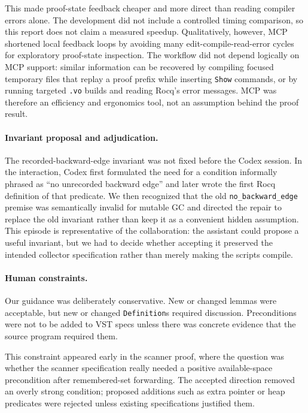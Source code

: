 \documentclass[acmsmall,nonacm]{acmart}
\newcommand{\Rocq}{Rocq}
\newcommand{\VST}{VST}
\begin{document}
This made proof-state feedback cheaper and more direct than reading compiler
errors alone.  The development did not include a controlled timing comparison,
so this report does not claim a measured speedup.  Qualitatively, however, MCP
shortened local feedback loops by avoiding many edit-compile-read-error cycles
for exploratory proof-state inspection.  The workflow did not depend logically
on MCP support: similar information can be recovered by compiling focused
temporary files that replay a proof prefix while inserting \texttt{Show}
commands, or by running targeted \texttt{.vo} builds and reading Rocq's error
messages.  MCP was therefore an efficiency and ergonomics tool, not an
assumption behind the proof result.

\paragraph{Invariant proposal and adjudication.}
The recorded-backward-edge invariant was not fixed before the Codex session.  In
the interaction, Codex first formulated the need for a condition informally
phrased as ``no unrecorded backward edge'' and later wrote the first \Rocq{}
definition of that predicate.  We then recognized that the old
\texttt{no\_backward\_edge} premise was semantically invalid for mutable GC and
directed the repair to replace the old invariant rather than keep it as a
convenient hidden assumption.  This episode is representative of the
collaboration: the assistant could propose a useful invariant, but we had
to decide whether accepting it preserved the intended collector specification
rather than merely making the scripts compile.

\paragraph{Human constraints.}
Our guidance was deliberately conservative.  New or changed lemmas were
acceptable, but new or changed \texttt{Definition}s required discussion.
Preconditions were not to be added to \VST{} specs unless there was concrete
evidence that the source program required them.

This constraint appeared early in the scanner proof, where the question was
whether the scanner specification really needed a positive available-space
precondition after remembered-set forwarding.  The accepted direction removed an
overly strong condition; proposed additions such as extra pointer or heap
predicates were rejected unless existing specifications justified them.
\end{document}
